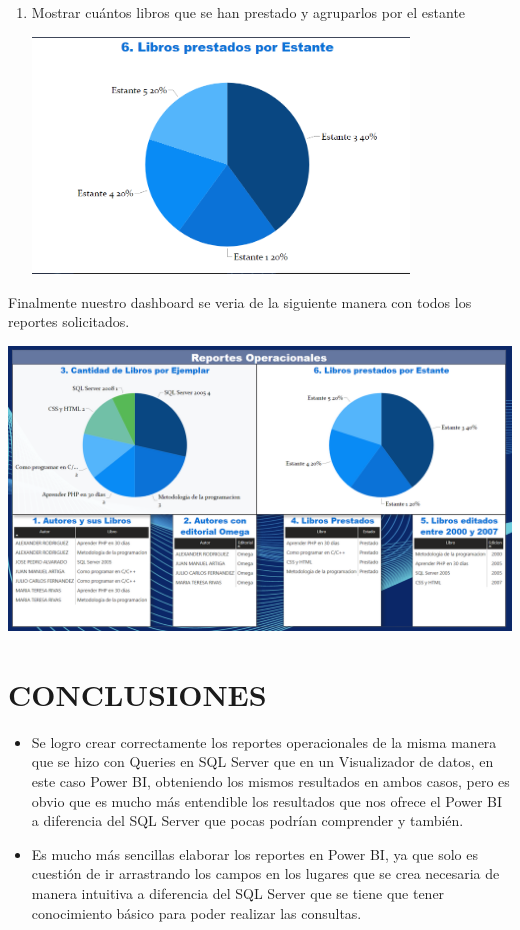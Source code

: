\documentclass[12pt,letterpaper]{article}
\newcommand\tab[1][1cm]{\hspace*{#1}}
\begin{document}
\begin{enumerate}[\tab 1.]
\begin{center}
        \end{center}
        \item Mostrar cuántos libros que se han prestado y agruparlos por el estante
        \begin{center}
            \includegraphics[width=10cm]{./img/img18.png}
        \end{center}
    \end{enumerate}
    Finalmente nuestro dashboard se veria de la siguiente manera con todos los reportes solicitados.
    \begin{center}
        \includegraphics[width=18cm]{./img/img19.png}
    \end{center}

    \newpage
    \section{CONCLUSIONES}
    \begin{itemize}
        \item Se logro crear correctamente los reportes operacionales de la misma manera que se hizo con Queries en SQL Server que en un Visualizador de datos, en este caso Power BI, obteniendo los mismos resultados en ambos casos, pero es obvio que es mucho más entendible los resultados que nos ofrece el Power BI a diferencia del SQL Server que pocas podrían comprender y también.
        \item Es mucho más sencillas elaborar los reportes en Power BI, ya que solo es cuestión de ir arrastrando los campos en los lugares que se crea necesaria de manera intuitiva a diferencia del SQL Server que se tiene que tener conocimiento básico para poder realizar las consultas.
    \end{itemize}
\end{document}
